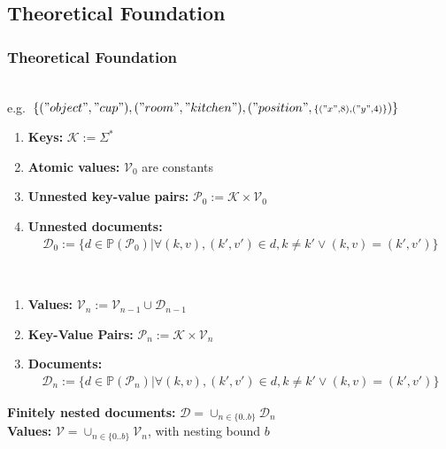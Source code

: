 \subsection{Theoretical Foundation}
\begin{frame}
  \frametitle{Theoretical Foundation}
\begin{description}[]
  \item[Definition of documents representing knowledge] \hfill \\
  \small e.g.~$\{("object","cup"),("room","kitchen"),("position",{\scriptstyle\{("x",8),("y",4)\}})\}$
  \pause
  \begin{enumerate}
\item \textbf{Keys:} $\mathcal{K} := \Sigma^*$
\item  \textbf{Atomic values:} $\mathcal{V}_0$ are constants
\item \textbf{Unnested key-value pairs:} $\mathcal{P}_0:=\mathcal{K}\times\mathcal{V}_0$
\item \textbf{Unnested documents:} \vspace{-0.3cm}
\begin{align*}
\mathcal{D}_0:=\{
  d\in\mathbb{P}(\mathcal{P}_0)|
  \forall (k,v),(k',v')\in d , k\neq k' \vee (k,v)=(k',v')
  \}
\end{align*}
\end{enumerate}
  \item[With nesting] \hfill \\
  \begin{enumerate}
\item  \textbf{Values:} $\mathcal{V}_n := \mathcal{V}_{n-1} \cup \mathcal{D}_{n-1}$
\item \textbf{Key-Value Pairs:} $\mathcal{P}_n:=\mathcal{K}\times\mathcal{V}_n$
\item \textbf{Documents:} \vspace{-0.3cm}
\begin{align*}
  \mathcal{D}_n:=\{
  d\in\mathbb{P}(\mathcal{P}_n)|
  \forall (k,v),(k',v')\in d , k\neq k' \vee (k,v)=(k',v')
  \}
\end{align*}
\end{enumerate}
  \end{description}
  \pause
  \textbf{Finitely nested documents:} $\mathcal{D}=\cup_{n\in\{0..b\}}\mathcal{D}_n$\\
  \textbf{Values:} $\mathcal{V}=\cup_{n\in\{0..b\}}\mathcal{V}_n$, with nesting bound $b$
\end{frame}

